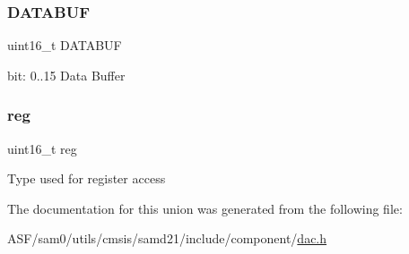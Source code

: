 \subsubsection{\texorpdfstring{DATABUF}{DATABUF}}
{\footnotesize\ttfamily uint16\+\_\+t D\+A\+T\+A\+B\+UF}

bit\+: 0..15 Data Buffer \mbox{\label{union_d_a_c___d_a_t_a_b_u_f___type_a11760f5020019f4aa8cb02e694f7cc44}} 
\subsubsection{\texorpdfstring{reg}{reg}}
{\footnotesize\ttfamily uint16\+\_\+t reg}

Type used for register access 

The documentation for this union was generated from the following file\+:\begin{DoxyCompactItemize}
\item 
A\+S\+F/sam0/utils/cmsis/samd21/include/component/\mbox{\hyperlink{component_2dac_8h}{dac.\+h}}\end{DoxyCompactItemize}
